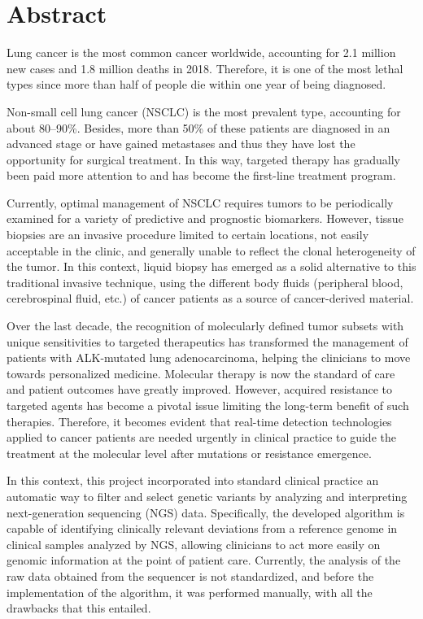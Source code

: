 \chapter*{Abstract}

Lung cancer is the most common cancer worldwide, accounting for 2.1 million new cases and 1.8 million deaths in 2018. Therefore, it is one of the most lethal types since more than half of people die within one year of being diagnosed.

Non-small cell lung cancer (NSCLC) is the most prevalent type, accounting for about 80–90\%. Besides, more than 50\% of these patients are diagnosed in an advanced stage or have gained metastases and thus they have lost the opportunity for surgical treatment. In this way, targeted therapy has gradually been paid more attention to and has become the first-line treatment program.

Currently, optimal management of NSCLC requires tumors to be periodically examined for a variety of predictive and prognostic biomarkers. However, tissue biopsies are an invasive procedure limited to certain locations, not easily acceptable in the clinic, and generally unable to reflect the clonal heterogeneity of the tumor. In this context, liquid biopsy has emerged as a solid alternative to this traditional invasive technique, using the different body fluids (peripheral blood, cerebrospinal fluid, etc.) of cancer patients as a source of cancer-derived material.

Over the last decade, the recognition of molecularly defined tumor subsets with unique sensitivities to targeted therapeutics has transformed the management of patients with ALK-mutated lung adenocarcinoma, helping the clinicians to move towards personalized medicine. Molecular therapy is now the standard of care and patient outcomes have greatly improved. However, acquired resistance to targeted agents has become a pivotal issue limiting the long-term benefit of such therapies. Therefore, it becomes evident that real-time detection technologies applied to cancer patients are needed urgently in clinical practice to guide the treatment at the molecular level after mutations or resistance emergence.

In this context, this project incorporated into standard clinical practice an automatic way to filter and select genetic variants by analyzing and interpreting next-generation sequencing (NGS) data. Specifically, the developed algorithm is capable of identifying clinically relevant deviations from a reference genome in clinical samples analyzed by NGS, allowing clinicians to act more easily on genomic information at the point of patient care. Currently, the analysis of the raw data obtained from the sequencer is not standardized, and before the implementation of the algorithm, it was performed manually, with all the drawbacks that this entailed.

